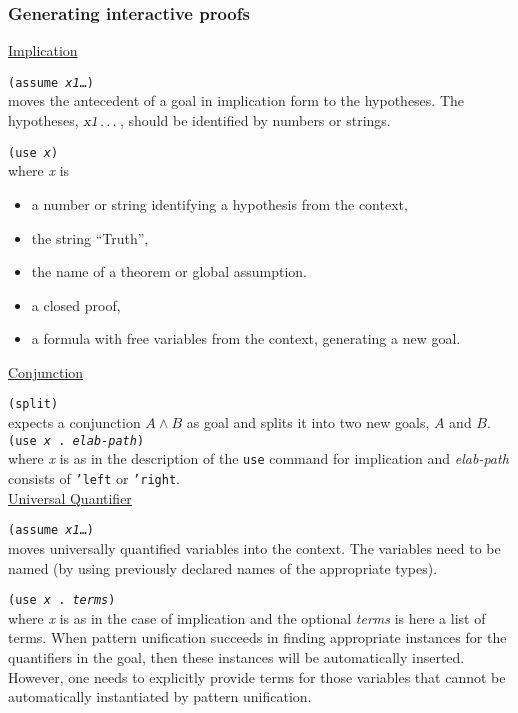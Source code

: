 \documentclass[12pt]{amsart}
\newcommand{\inquotes}[1]{``#1''}
\begin{document}
\subsubsection{Generating interactive proofs}

\underline{Implication}

\texttt{(assume \textsl{x1}\dots)}\\
moves the antecedent of a goal in implication form to
the hypotheses. The hypotheses,  $\textsl{x1}\dots$,
should be identified by numbers
or strings.

\texttt{(use \textsl{x})}\\
where \textsl{x} is
\begin{itemize}
\item a number or string identifying a hypothesis from the context,
\item the string \inquotes{Truth},
\item the name of a theorem or global assumption.
\item a closed proof,
\item a formula with free variables from the context, generating a new
goal.\\
\end{itemize}

\underline{Conjunction}

\texttt{(split)}\\
expects a conjunction $A \land B$ as goal and splits it into
two new goals, $A$ and $B$.\\

\texttt{(use \textsl{x} . \textsl{elab-path})}\\
where \textsl{x} is as in the description of the \texttt{use}
command for implication and \textsl{elab-path} consists of \texttt{'left}
or \texttt{'right}.\\

\underline{Universal Quantifier}

\texttt{(assume \textsl{x1}\dots)}\\
moves universally quantified variables into the context.  The variables
need to be named (by using previously declared names of
the appropriate types).

\texttt{(use \textsl{x} . \textsl{terms})}\\
where \textsl{x} is as in the case of implication and the optional
\textsl{terms} is here a list of terms.  When pattern unification
succeeds in finding appropriate instances for the quantifiers in the
goal, then these instances will be automatically inserted.  However,
one needs to explicitly provide terms for those variables that cannot
be automatically instantiated by pattern
unification.
\end{document}
